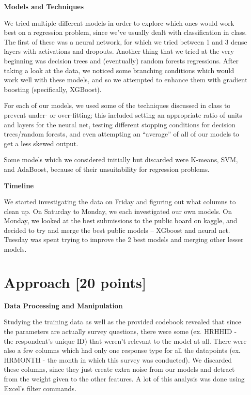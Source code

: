 \noindent
\textbf{Models and Techniques}

\noindent
We tried multiple different models in order to explore which ones would work best on a regression problem, since we’ve usually dealt with classification in class. The first of these was a neural network, for which we tried between 1 and 3 dense layers with activations and dropouts. Another thing that we tried at the very beginning was decision trees and (eventually) random forests regressions. After taking a look at the data, we noticed some branching conditions which would work well with these models, and so we attempted to enhance them with gradient boosting (specifically, XGBoost). 

\noindent
For each of our models, we used some of the techniques discussed in class to prevent under- or over-fitting; this included setting an appropriate ratio of units and layers for the neural net, testing different stopping conditions for decision trees/random forests, and even attempting an “average” of all of our models to get a less skewed output.

\noindent
Some models which we considered initially but discarded were K-means, SVM, and AdaBoost, because of their unsuitability for regression problems.

\vspace{1ex}
\noindent
\textbf{Timeline}

\noindent
We started investigating the data on Friday and figuring out what columns to clean up. On Saturday to Monday, we each investigated our own models. On Monday, we looked at the best submissions to the  public board on kaggle, and decided to try and merge the best public models -- XGboost and neural net. Tuesday was spent trying to improve the 2 best models and merging other lesser models. 

\newpage

\section{Approach [20 points]}

\vspace{2ex}

\noindent
\textbf{Data Processing and Manipulation}

\noindent
Studying the training data as well as the provided codebook revealed that since the parameters are actually survey questions, there were some (ex. HRHHID - the respondent’s unique ID) that weren’t relevant to the model at all. There were also a few columns which had only one response type for all the datapoints (ex. HRMONTH - the month in which this survey was conducted). We discarded these columns, since they just create extra noise from our models and detract from the weight given to the other features. A lot of this analysis was done using Excel’s filter commands.

